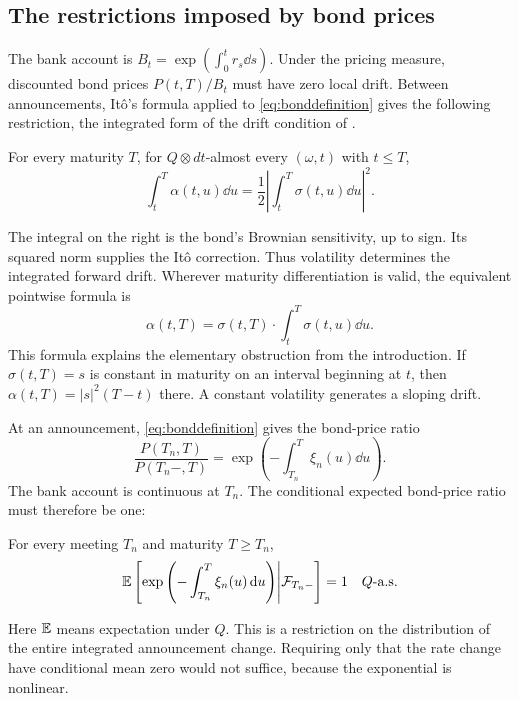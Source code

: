 \subsection{The restrictions imposed by bond prices}
The bank account is $B_t=\exp(\int_0^t r_s\dd s)$. Under the pricing measure, discounted bond prices $P(t,T)/B_t$ must have zero local drift. Between announcements, It\^o's formula applied to \eqref{eq:bonddefinition} gives the following restriction, the integrated form of the drift condition of \citet{heath1992bond}.

\begin{assumption}\label{ass:drift}
For every maturity $T$, for $Q\otimes dt$-almost every $(\omega,t)$ with $t\le T$,
\begin{equation}
\int_t^T\alpha(t,u)\dd u
 =\frac12\left|\int_t^T\sigma(t,u)\dd u\right|^2.
\label{eq:drift}
\end{equation}
\end{assumption}
The integral on the right is the bond's Brownian sensitivity, up to sign. Its squared norm supplies the It\^o correction. Thus volatility determines the integrated forward drift. Wherever maturity differentiation is valid, the equivalent pointwise formula is
\begin{equation}
\alpha(t,T)=\sigma(t,T)\cdot\int_t^T\sigma(t,u)\dd u.
\label{eq:diffdrift}
\end{equation}
This formula explains the elementary obstruction from the introduction. If $\sigma(t,T)=s$ is constant in maturity on an interval beginning at $t$, then $\alpha(t,T)=|s|^2(T-t)$ there. A constant volatility generates a sloping drift.

At an announcement, \eqref{eq:bonddefinition} gives the bond-price ratio
\[
\frac{P(T_n,T)}{P(T_n-,T)}
 =\exp\left(-\int_{T_n}^T\xi_n(u)\dd u\right).
\]
The bank account is continuous at $T_n$. The conditional expected bond-price ratio must therefore be one:
\begin{assumption}\label{ass:jump}
For every meeting $T_n$ and maturity $T\ge T_n$,
\begin{equation}
\mathbb E\left[\exp\left(-\int_{T_n}^T\xi_n(u)\,\mathrm d u\right)
 \middle|\mathcal F_{T_n-}\right]=1\quad Q\text{-a.s.}
\label{eq:jump}
\end{equation}
\end{assumption}
Here $\mathbb E$ means expectation under $Q$. This is a restriction on the distribution of the entire integrated announcement change. Requiring only that the rate change have conditional mean zero would not suffice, because the exponential is nonlinear.

